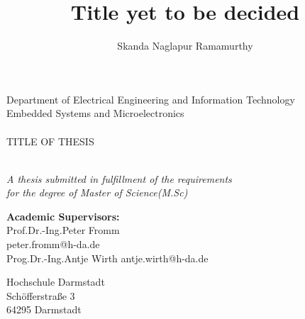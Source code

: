 \author{Skanda Naglapur Ramamurthy}
\title{Title yet to be decided}

%
\setlength{\parskip}{6pt}
\begin{titlepage}
\begin{center}
\begin{figure}
\centering
{}
\qquad
{}
\end{figure}

{\Large Department of Electrical Engineering and Information Technology}\\[1.5cm]
{\large Embedded Systems and Microelectronics}\\[0.5cm]

\HRule \\[0.4cm]
{ \huge TITLE OF THESIS}\\[0.4cm]
\HRule \\[0.4cm]
\end{center}

\begin{center}
{\textit{A thesis submitted in fulfillment of the requirements\\ for the degree of Master of Science(M.Sc)}}\\[1cm]






\begin{minipage}{0.4\textwidth}
\begin{flushleft}
\textbf{Academic Supervisors:}\\[0.1cm]
Prof.Dr.-Ing.Peter Fromm\\
peter.fromm@h-da.de\\[0.2cm]
Prog.Dr.-Ing.Antje Wirth
antje.wirth@h-da.de\\[0.2cm]
\end{flushleft}
\end{minipage}
\begin{minipage}{0.4\textwidth}
\begin{flushright} 
Hochschule Darmstadt \\
Schöfferstraße 3 \\
64295 Darmstadt\\
\end{flushright}
\end{minipage}
\vspace{1cm}



\end{center}
\end{titlepage}
